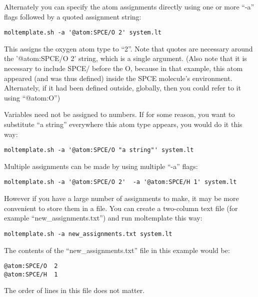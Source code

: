 \documentclass[11pt]{article}
\begin{document}
Alternately you can specify the atom assignments directly 
using one or more ``-a'' flags followed by a quoted assignment string:
\begin{verbatim}
moltemplate.sh -a '@atom:SPCE/O 2' system.lt
\end{verbatim}
This assigns the oxygen atom type to ``2''.
Note that quotes are necessary around the '@atom:SPCE/O 2' string, 
which is a single argument.
(Also note that it is necessary to include SPCE/ before 
 the O, 
 because in that example, 
 this atom
 appeared (and 
 was
 thus defined) inside the SPCE molecule's environment.
 Alternately, if 
 it
 had been defined outside, globally, 
 then you could refer to 
 it
 using 
 ``@atom:O'')

Variables need not be assigned to numbers.
If for some reason, you want to substitute ``a string'' everywhere 
this atom type appears, you would do it this way:
\begin{verbatim}
moltemplate.sh -a '@atom:SPCE/O "a string"' system.lt
\end{verbatim}

Multiple assignments can be made by using multiple ``-a'' flags:
\begin{verbatim}
moltemplate.sh -a '@atom:SPCE/O 2'  -a '@atom:SPCE/H 1' system.lt
\end{verbatim}
However if you have a large number of assignments to make, 
it may be more convenient to store them in a file.  
You can create a two-column text file (for example ``new\_assignments.txt'')
and run moltemplate this way:
\begin{verbatim}
moltemplate.sh -a new_assignments.txt system.lt
\end{verbatim}
The contents of the ``new\_assignments.txt'' file in this example would be:
\begin{verbatim}
@atom:SPCE/O  2
@atom:SPCE/H  1
\end{verbatim}
The order of lines in this file does not matter.


\end{document}
